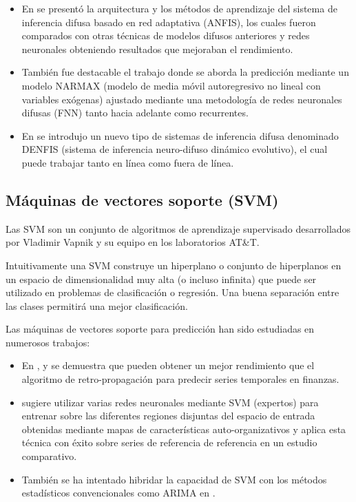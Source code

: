 \documentclass{llncs}
\begin{document}
\begin{itemize}

\item En \cite{jang1993anfis} se presentó la arquitectura y los métodos de aprendizaje del sistema de inferencia difusa basado en red adaptativa (ANFIS), los cuales fueron comparados con otras técnicas de modelos difusos anteriores y redes neuronales obteniendo resultados que mejoraban el rendimiento.

\item También fue destacable el trabajo \cite{gao2005narmax}  donde se aborda la predicción mediante un modelo NARMAX (modelo de media móvil autoregresivo no lineal con variables exógenas) ajustado mediante una metodología de redes neuronales difusas (FNN) tanto hacia adelante como recurrentes.

\item En \cite{kasabov2002denfis} se introdujo un nuevo tipo de sistemas de inferencia difusa denominado DENFIS (sistema de inferencia neuro-difuso dinámico evolutivo), el cual puede trabajar tanto en línea como fuera de línea.

\end{itemize}

\subsection{Máquinas de vectores soporte (SVM)}
Las SVM son un conjunto de algoritmos de aprendizaje supervisado desarrollados por Vladimir Vapnik y su equipo en los laboratorios AT\&T.

Intuitivamente una SVM construye un hiperplano o conjunto de hiperplanos en un espacio de dimensionalidad muy alta (o incluso infinita) que puede ser utilizado en problemas de clasificación o regresión. Una buena separación entre las clases permitirá una mejor clasificación.

Las máquinas de vectores soporte para predicción han sido estudiadas en numerosos trabajos:
\begin{itemize}

\item En \cite{cao2003support}, \cite{Tay2001309} y \cite{kim2003financial} se demuestra que pueden obtener un mejor rendimiento que el algoritmo de retro-propagación para predecir series temporales en finanzas. 
\item \cite{Cao2003321} sugiere utilizar varias redes neuronales mediante SVM (expertos) para entrenar sobre las diferentes regiones disjuntas del espacio de entrada obtenidas mediante mapas de características auto-organizativos y aplica esta técnica con éxito sobre series de referencia de referencia en un estudio comparativo.
\item También se ha intentado hibridar la capacidad de SVM con los métodos estadísticos convencionales como ARIMA en \cite{pai2005hybrid}.
 
\end{itemize}
\end{document}
